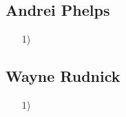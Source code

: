 \documentclass{article}
\begin{document}
\subsection{Andrei Phelps}
\begin{itemize}
    \item[1)]
\end{itemize}

\subsection{Wayne Rudnick}
\begin{itemize}
    \item[1)]
\end{itemize}
\end{document}
